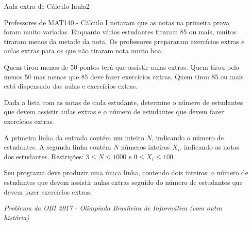 \documentclass[12pt,a4paper,oneside]{article}
\begin{document}
\begin{problem}{Aula extra de Cálculo I}{aula}{2}

Professores de MAT140 - Cálculo I notaram que as notas na primeira prova foram muito variadas. Enquanto vários estudantes tiraram 85 ou mais, muitos tiraram menos da metade da nota. Os professores prepararam exercícios extras e aulas extras para os que não tiraram nota muito boa.

Quem tirou menos de 50 pontos terá que assistir aulas extras. Quem tirou pelo menos 50 mas menos que 85 deve fazer exercícios extras. Quem tirou 85 ou mais está dispensado das aulas e exercícios extras.

Dada a lista com as notas de cada estudante, determine o número de estudantes que devem assistir aulas extras e o número de estudantes que devem fazer exercícios extras.

%

\InputFile

A primeira linha da entrada contém um inteiro $N$, indicando o número de estudantes. A segunda linha contém $N$ números inteiros $X_i$, indicando as notas dos estudantes. Restrições: $3 \leq N \leq 1000$ e $0 \leq X_i \leq 100$.


\OutputFile

Seu programa deve produzir uma única linha, contendo dois inteiros: o número de estudantes que devem assistir aulas extras seguido do número de estudantes que devem fazer exercícios extras.


\Example

\begin{example}
%
\end{example}

\begin{example}
%
\end{example}


\textit{Problema da OBI 2017 - Olimpíada Brasileira de Informática (com outra história)}

\end{problem}
\end{document}
